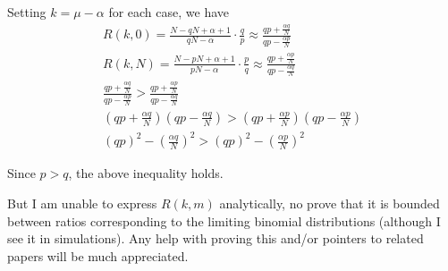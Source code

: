 \documentclass[11pt,draft]{article}
\begin{document}
Setting  $k=\mu - \alpha$ for each case, we have
\begin{align}
R(k,0) =  \frac{N-qN + \alpha+1}{qN-\alpha} \cdot \frac{q}{p} \approx \frac{qp + \frac{\alpha q}{N}}{qp - \frac{\alpha p}{N}}\\
R(k,N) = \frac{N-pN + \alpha+1}{pN-\alpha} \cdot \frac{p}{q} \approx \frac{qp + \frac{\alpha p}{N}}{qp - \frac{\alpha q}{N}}\\
\frac{qp + \frac{\alpha q}{N}}{qp - \frac{\alpha p}{N}} >  \frac{qp + \frac{\alpha p}{N}}{qp - \frac{\alpha q}{N}} \\
(qp + \frac{\alpha q}{N})(qp - \frac{\alpha q}{N}) > (qp + \frac{\alpha p}{N})(qp - \frac{\alpha p}{N}) \\
(qp)^2 - \left ( \frac{\alpha q}{N} \right )^2 > (qp)^2 - \left ( \frac{\alpha p}{N} \right )^2 
\end{align}

Since $p>q$, the above inequality holds.

But I am unable to express $R(k,m)$ analytically, no prove that it is bounded between ratios corresponding to the limiting binomial distributions (although I see it in simulations).
Any help with proving this and/or pointers to related papers will be much appreciated.
\end{document}
